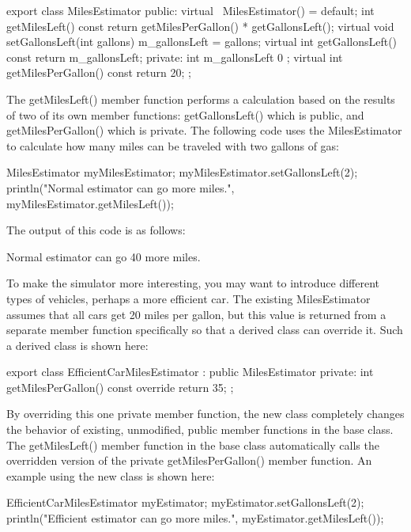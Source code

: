 \begin{cpp}
export class MilesEstimator
{
    public:
        virtual ~MilesEstimator() = default;
        int getMilesLeft() const { return getMilesPerGallon() * getGallonsLeft(); }
        virtual void setGallonsLeft(int gallons) { m_gallonsLeft = gallons; }
        virtual int getGallonsLeft() const { return m_gallonsLeft; }
    private:
        int m_gallonsLeft { 0 };
        virtual int getMilesPerGallon() const { return 20; }
};
\end{cpp}

The getMilesLeft() member function performs a calculation based on the results of two of its own member functions: getGallonsLeft() which is public, and getMilesPerGallon() which is private. The following code uses the MilesEstimator to calculate how many miles can be traveled with two gallons of gas:

\begin{cpp}
MilesEstimator myMilesEstimator;
myMilesEstimator.setGallonsLeft(2);
println("Normal estimator can go {} more miles.",
    myMilesEstimator.getMilesLeft());
\end{cpp}

The output of this code is as follows:

\begin{shell}
Normal estimator can go 40 more miles.
\end{shell}

To make the simulator more interesting, you may want to introduce different types of vehicles, perhaps a more efficient car. The existing MilesEstimator assumes that all cars get 20 miles per gallon, but this value is returned from a separate member function specifically so that a derived class can override it. Such a derived class is shown here:

\begin{cpp}
export class EfficientCarMilesEstimator : public MilesEstimator
{
    private:
        int getMilesPerGallon() const override { return 35; }
};
\end{cpp}

By overriding this one private member function, the new class completely changes the behavior of existing, unmodified, public member functions in the base class. The getMilesLeft() member function in the base class automatically calls the overridden version of the private getMilesPerGallon() member function. An example using the new class is shown here:

\begin{cpp}
EfficientCarMilesEstimator myEstimator;
myEstimator.setGallonsLeft(2);
println("Efficient estimator can go {} more miles.",
        myEstimator.getMilesLeft());
\end{cpp}

